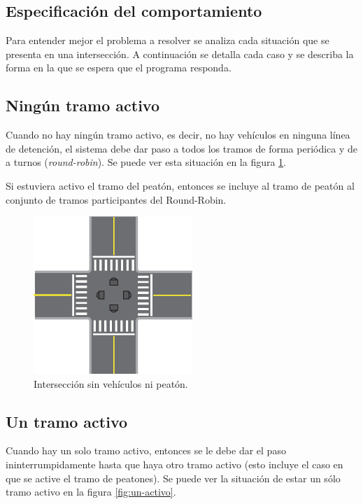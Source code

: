 \subsection{Especificación del comportamiento}\label{sec:spec}

	Para entender mejor el problema a resolver se analiza cada situación que se presenta en una intersección.
	A continuación se detalla cada caso y se describa la forma en la que se espera que el programa responda.



\subsection{Ningún tramo activo}

	Cuando no hay ningún tramo activo, es decir, no hay vehículos en ninguna línea de detención, el sistema debe dar paso a todos los tramos de forma periódica y de a turnos (\emph{round-robin}).
	Se puede ver esta situación en la figura \ref{fig:ningun-activo}.

	Si estuviera activo el tramo del peatón, entonces se incluye al tramo de peatón al conjunto de tramos participantes del Round-Robin.

	\begin{figure}[htbp]
		\centering
		\includegraphics[width=6cm]{imagenes/ningun-activo.eps}
		\caption{Intersección sin vehículos ni peatón.}
		\label{fig:ningun-activo}
	\end{figure}



\subsection{Un tramo activo}

	Cuando hay un solo tramo activo, entonces se le debe dar el paso ininterrumpidamente hasta que haya otro tramo activo (esto incluye el caso en que se active el tramo de peatones).
	Se puede ver la situación de estar un sólo tramo activo en la figura \ref{fig:un-activo}.

